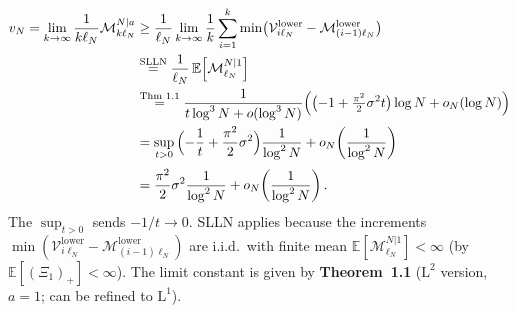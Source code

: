 \small
\begin{align*}
    v_N
    =
    \lim_{k\to\infty}
    \frac 1{k\ell_N}
    \mathcal M^{N|a}_{k\ell_N}
    &\ge
    \frac 1{\ell_N}
    \lim_{k\to\infty}
    \frac 1k
    \sum_{i=1}^k
    \min\bigl(
        \mathcal V^{\mathrm{lower}}_{i\ell_N}
        -
        \mathcal M^{\mathrm{lower}}_{(i-1)\ell_N}
    \bigr)
    \\
    &\stackrel{\text{SLLN}}{=}
    \frac 1{\ell_N}\,
    \mathbb E\!\left[\mathcal M^{N|1}_{\ell_N}\right]
    \\
    &\stackrel{\text{Thm~1.1}}{=}
    \frac 1{t\log^3N+o(\log^3N)}
    \Bigl(
        \bigl(-1+\tfrac{\pi^2}2\sigma^2t\bigr)\log N
        +
        o_N(\log N)
    \Bigr)
    \\
    &=
    \sup_{t>0}\,
    \Bigl(-\frac 1t+\frac{\pi^2}2\sigma^2\Bigr)\frac{1}{\log^2 N}
    + o_N\!\left(\frac{1}{\log^2 N}\right)
    \\[3pt]
    &=
    \frac{\pi^2}{2}\sigma^2\frac{1}{\log^2 N}
    + o_N\!\left(\frac{1}{\log^2 N}\right).
\end{align*}
The $\sup_{t>0}$ sends $-1/t\to 0$.  SLLN applies because the increments
$\min(\mathcal V^{\mathrm{lower}}_{i\ell_N}-\mathcal M^{\mathrm{lower}}_{(i-1)\ell_N})$
are i.i.d.\ with finite mean $\mathbb E[\mathcal M^{N|1}_{\ell_N}]<\infty$ (by
$\mathbb E[(\Xi_1)_+]<\infty$).  The limit constant is given by
\textbf{Theorem~1.1} ($\mathrm L^2$ version, $a=1$; can be refined to
$\mathrm L^1$).
